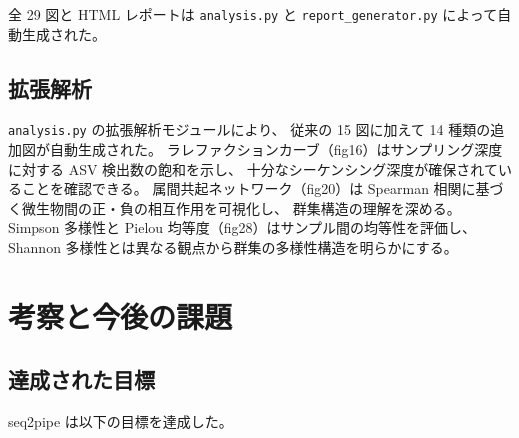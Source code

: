 \documentclass[12pt, a4paper]{article}
\begin{document}
全 29 図と HTML レポートは \texttt{analysis.py} と
\texttt{report\_generator.py} によって自動生成された。

\subsection{拡張解析}

\texttt{analysis.py} の拡張解析モジュールにより、
従来の 15 図に加えて 14 種類の追加図が自動生成された。
ラレファクションカーブ（fig16）はサンプリング深度に対する ASV 検出数の飽和を示し、
十分なシーケンシング深度が確保されていることを確認できる。
属間共起ネットワーク（fig20）は Spearman 相関に基づく微生物間の正・負の相互作用を可視化し、
群集構造の理解を深める。
Simpson 多様性と Pielou 均等度（fig28）はサンプル間の均等性を評価し、
Shannon 多様性とは異なる観点から群集の多様性構造を明らかにする。

\section{考察と今後の課題}

\subsection{達成された目標}

seq2pipe は以下の目標を達成した。
\end{document}
